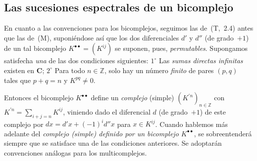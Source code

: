 \subsection{Las sucesiones espectrales de un bicomplejo}
\label{subsection:0.11.3}
\label{subsection:0.11.3-fr}

\begin{env}[11.3.1]
\label{0.11.3.1}
\label{0.11.3.1-fr}
En cuanto a las convenciones para los bicomplejos, seguimos las de~(T,~2.4) antes que las de~(M), suponiéndose así que los dos diferenciales $d'$ y $d''$ (de grado~$+1$) de un tal bicomplejo $K^{\bullet\bullet}=(K^{ij})$ se suponen, pues, \emph{permutables}. Supongamos satisfecha \emph{una} de las dos condiciones siguientes: $1^\circ$ Las \emph{sumas directas infinitas} existen en $\boldsymbol{C}$; $2^\circ$ Para todo $n\in\mathbb Z$, solo hay un número \emph{finito} de pares $(p,q)$ tales que $p+q=n$ y $K^{pq}\ne0$.
 
Entonces el bicomplejo $K^{\bullet\bullet}$ define un \emph{complejo} (simple) $(K^{\prime n})_{n\in\mathbb Z}$ con $K^{\prime n}=\sum_{i+j=n}K^{ij}$, viniendo dado el diferencial $d$ (de grado~$+1$) de este complejo por $dx=d'x+(-1)^i d''x$ para $x\in K^{ij}$.
Cuando hablemos más adelante del \emph{complejo (simple) definido por un bicomplejo $K^{\bullet\bullet}$}, se sobreentenderá siempre que se satisface una de las condiciones anteriores.
Se adoptarán convenciones análogas para los multicomplejos.


\end{env}
